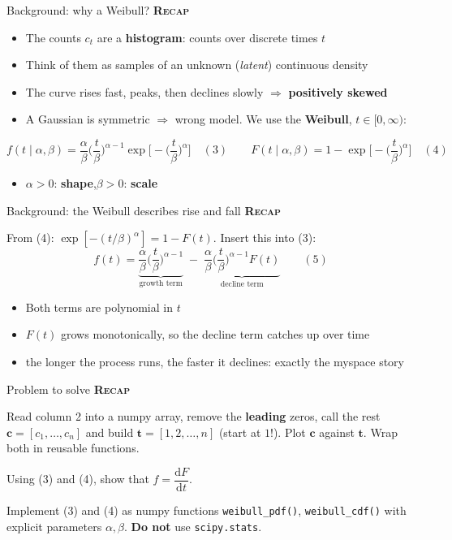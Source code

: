 \documentclass[aspectratio=169,11pt]{beamer}
\newcommand{\stage}[2]{{\color{#1}\bfseries\small\textsc{#2}}\par\smallskip}
\newcommand{\Given}{\stage{given}{Recap}}
\begin{document}
\begin{frame}{Background: why a Weibull?}
\Given
\begin{itemize}
\item The counts $c_t$ are a \textbf{histogram}: counts over discrete times $t$
\item Think of them as samples of an unknown (\emph{latent}) continuous density
\item The curve rises fast, peaks, then declines slowly $\Rightarrow$ \textbf{positively skewed}
\item A Gaussian is symmetric $\Rightarrow$ wrong model. We use the \textbf{Weibull}, $t\in[0,\infty)$:
\end{itemize}
\[
f(t\mid\alpha,\beta)=\frac{\alpha}{\beta}\Big(\frac t\beta\Big)^{\alpha-1}\exp\!\Big[-\Big(\frac t\beta\Big)^{\alpha}\Big]\quad(3)
\qquad
F(t\mid\alpha,\beta)=1-\exp\!\Big[-\Big(\frac t\beta\Big)^{\alpha}\Big]\quad(4)
\]
\begin{itemize}
\item $\alpha>0$: \textbf{shape},\quad $\beta>0$: \textbf{scale}
\end{itemize}
\end{frame}

\begin{frame}{Background: the Weibull describes rise and fall}
\Given
From (4): $\exp[-(t/\beta)^\alpha]=1-F(t)$. Insert this into (3):
\[
f(t)=\underbrace{\frac{\alpha}{\beta}\Big(\frac t\beta\Big)^{\alpha-1}}_{\text{growth term}}
\;-\;\underbrace{\frac{\alpha}{\beta}\Big(\frac t\beta\Big)^{\alpha-1}F(t)}_{\text{decline term}}\qquad(5)
\]
\begin{itemize}
\item Both terms are polynomial in $t$
\item $F(t)$ grows monotonically, so the decline term catches up over time
\item[$\Rightarrow$] the longer the process runs, the faster it declines: exactly the myspace story
\end{itemize}
\end{frame}

\begin{frame}{Problem to solve}\small
\Given
\begin{description}[Task 2.1.1]
\item[Task 2.1.1] Read column 2 into a numpy array, remove the \textbf{leading} zeros, call the rest
$\bm c=[c_1,\dots,c_n]$ and build $\bm t=[1,2,\dots,n]$ (start at $1$!). Plot $\bm c$ against $\bm t$.
Wrap both in reusable functions.
\item[Mini ex.] Using (3) and (4), show that $f=\dfrac{\mathrm dF}{\mathrm dt}$.
\item[Task 2.1.2] Implement (3) and (4) as numpy functions \texttt{weibull\_pdf()}, \texttt{weibull\_cdf()}
with explicit parameters $\alpha,\beta$. \textbf{Do not} use \texttt{scipy.stats}.
\end{description}
\end{frame}
\end{document}
